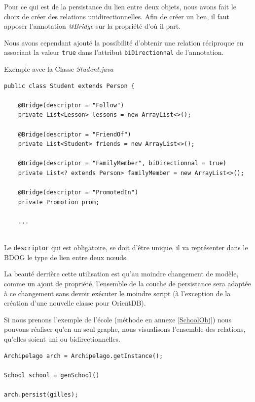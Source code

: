 \documentclass[a4paper,fleqn,12pt]{report}
\begin{document}
Pour ce qui est de la persistance du lien entre deux objets, nous avons fait le choix de créer des relations unidirectionnelles. Afin de créer un lien, il faut apposer l'annotation \textit{@Bridge} sur la propriété d'où il part.

Nous avons cependant ajouté la possibilité d'obtenir une relation réciproque en associant la valeur \texttt{true} dans l'attribut \texttt{biDirectionnal} de l'annotation. 

Exemple avec la Classe \textit{Student.java}

\begin{lstlisting}
public class Student extends Person {

    @Bridge(descriptor = "Follow")
    private List<Lesson> lessons = new ArrayList<>();
    
    @Bridge(descriptor = "FriendOf")
    private List<Student> friends = new ArrayList<>();
    
    @Bridge(descriptor = "FamilyMember", biDirectionnal = true)
    private List<? extends Person> familyMember = new ArrayList<>();
    
    @Bridge(descriptor = "PromotedIn")
    private Promotion prom;
    
    ...
    
\end{lstlisting}

Le \texttt{descriptor} qui est obligatoire, se doit d'être unique, il va représenter dans le BDOG le type de lien entre deux nœuds.

La beauté derrière cette utilisation est qu'au moindre changement de modèle, comme un ajout de propriété, l'ensemble de la couche de persistance sera adaptée à ce changement sans devoir exécuter le moindre script (à l'exception de la création d'une nouvelle classe pour OrientDB).

Si nous prenons l'exemple de l'école (méthode en annexe \ref{SchoolObj}) nous pouvons réaliser qu'en un seul graphe, nous visualisons l'ensemble des relations, qu'elles soient uni ou bidirectionnelles.

\begin{lstlisting}
Archipelago arch = Archipelago.getInstance();

School school = genSchool()

arch.persist(gilles);
\end{lstlisting}
\end{document}
